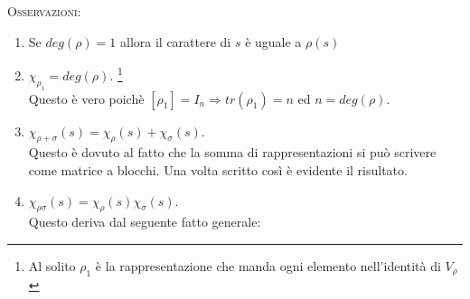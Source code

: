 \documentclass[11pt]{article}
\theoremstyle{plain}
\theoremstyle{definition}
\theoremstyle{remark}
\begin{document}
\textsc{Osservazioni:}
\begin{enumerate}
	\item Se $deg(\rho) = 1$ allora il carattere di $s$ è uguale a $\rho(s)$
	\item $\chi_{\rho_1} = deg(\rho)$. \footnote{Al solito $\rho_1$ è la rappresentazione che manda ogni elemento nell'identità di $V_\rho$}\\
	Questo è vero poichè $[\rho_1]=I_n\Rightarrow tr(\rho_1)=n$ ed $n=deg(\rho)$.
	\item $\chi_{\rho + \sigma}(s) = \chi_\rho(s) + \chi_\sigma(s)$.\\ 
	Questo è dovuto al fatto che la somma di rappresentazioni si può scrivere come matrice a blocchi. Una volta scritto così è evidente il risultato.
	\item $\chi_{\rho\sigma}(s) = \chi_\rho(s)\chi_\sigma(s)$.\\ 
	Questo deriva dal seguente fatto generale:
	

\end{enumerate}
\end{document}
